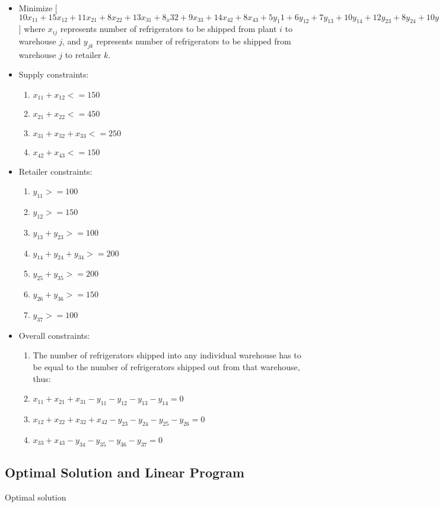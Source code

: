 \documentclass[11pt]{scrreprt}
\begin{document}
\begin{itemize}
	\item Minimize
[$10x_{11}+15x_{12}+11x_{21}+8x_{22}+13x_{31}+8_x{32}+9x_{33}+14x_{42}+8x_{43}+5y_{1}1+6y_{12}+7y_{13}+10y_{14}+12y_{23}+8y_{24}+10y_{25}+14y_{26}+12y_{35}+12y_{36}+6y_{37}$] 
where $x_{ij}$ represents number of refrigerators to be shipped from 
plant $i$ to warehouse $j$, and $y_{jk}$ represents number of 
refrigerators to be shipped  from warehouse $j$ to retailer $k$.
	\item Supply constraints:
	\begin{enumerate}
		\item $x_{11} + x_{12} <= 150$
		\item $x_{21} + x_{22} <= 450$
		\item $x_{31} + x_{32} + x_{33} <= 250$
		\item $x_{42} + x_{43} <= 150$
	\end{enumerate}
	\item Retailer constraints:
	\begin{enumerate}
		\item $y_{11} >= 100$
		\item $y_{12} >= 150$
		\item $y_{13} + y_{23} >= 100$
		\item $y_{14} + y_{24} + y_{34} >= 200$
		\item $y_{25} + y_{35} >= 200$
		\item $y_{26} + y_{36} >= 150$
		\item $y_{37} >= 100$
	\end{enumerate}
	\item Overall constraints:
	\begin{enumerate}
		\item The number of refrigerators shipped into any individual 
		warehouse has to be equal to the number of refrigerators 
		shipped out from that warehouse, thus:
		\item $x_{11} + x_{21} + x_{31} - y_{11} - y_{12} - y_{13} - y_{14} = 0$
		\item $x_{12} + x_{22} + x_{32} + x_{42} - y_{23} - y_{24} - y_{25} - y_{26} = 0$
		\item $x_{33} + x_{43} - y_{34} - y_{35} - y_{36} - y_{37} = 0$
	\end{enumerate}
\end{itemize}

\subsection{Optimal Solution and Linear Program}
Optimal solution
\end{document}
